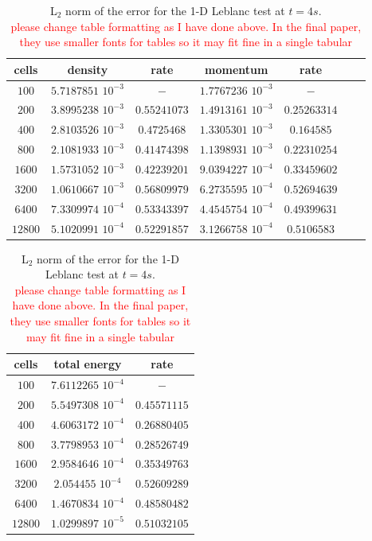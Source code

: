 \documentclass[preprint,10pt]{elsarticle}
\newcommand{\tcr}[1]{\textcolor{red}{#1}}
\begin{document}
%
\begin{table}[!htbp]
\begin{center}
 \caption{\label{tbl:l2_norm_leblanc} L$_2$ norm of the error for the 1-D Leblanc test at $t=4s$.\\ \tcr{please change table formatting as I have done above. In the final paper, they use smaller fonts for tables so it may fit fine in a single tabular}
}
 \begin{tabular}{|c|c|c|c|c|c|c|}
 \hline
   cells & density & rate & momentum & rate \\
 \hline
$100$ &   $5.7187851$ $10^{-3}$ & $-$ & $1.7767236$ $10^{-3}$ & $-$ \\
  \hline
$200$  &  $3.8995238$ $10^{-3}$ & $0.55241073$ & $1.4913161$ $10^{-3}$ & $0.25263314$ \\
   \hline
$400$ & $2.8103526$ $10^{-3}$   & $0.4725468$ & $1.3305301$ $10^{-3}$ & $0.164585$ \\
 \hline
$800$ & $2.1081933$ $10^{-3}$   & $0.41474398$ & $1.1398931$ $10^{-3}$ & $0.22310254$ \\
 \hline
$1600$ & $1.5731052$ $10^{-3}$  & $0.42239201$ & $9.0394227$ $10^{-4}$ & $0.33459602$ \\
 \hline
$3200$&$1.0610667$ $10^{-3}$    & $0.56809979$ & $6.2735595$ $10^{-4}$ & $0.52694639$ \\
 \hline
$6400$&$7.3309974$ $10^{-4}$    & $0.53343397$ & $4.4545754$ $10^{-4}$ & $0.49399631$ \\
 \hline
 $12800$&$5.1020991$ $10^{-4}$  & $0.52291857$ & $3.1266758$ $10^{-4}$ & $0.5106583$ \\
 \hline
\end{tabular}
\begin{tabular}{|c|c|c|}
\hline
cells & total energy & rate \\ \hline
$100$ & $7.6112265$  $10^{-4}$& $-$\\ \hline
$200$ & $5.5497308$ $10^{-4}$& $0.45571115$\\ \hline
$400$ & $4.6063172$ $10^{-4}$ & $0.26880405$\\ \hline
$800$ & $3.7798953$ $10^{-4}$ & $0.28526749$\\ \hline
$1600$ & $2.9584646$ $10^{-4}$ & $0.35349763$\\ \hline
$3200$ & $2.054455$ $10^{-4}$ & $0.52609289$\\ \hline
$6400$ & $1.4670834$ $10^{-4}$ & $0.48580482$\\ \hline
$12800$ & $1.0299897$ $10^{-5}$ & $0.51032105$\\  \hline
\end{tabular}
\end{center}
\nonumber
\end{table}
\end{document}
